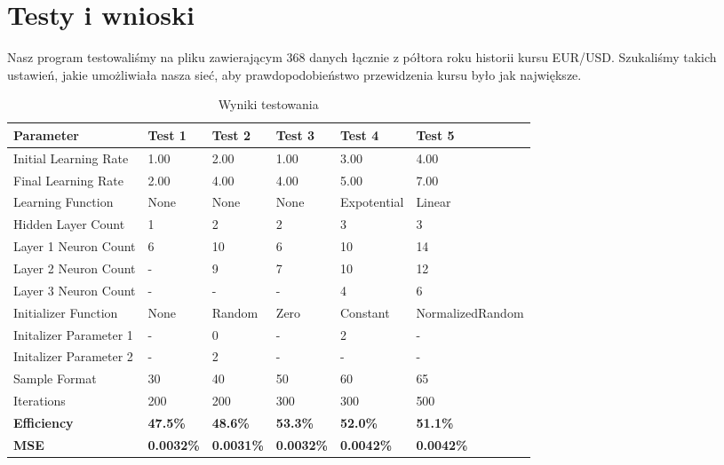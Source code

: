 \documentclass[a4paper]{article}
\begin{document}
		\part{Testy i wnioski}\indent\indent
		Nasz program testowaliśmy na pliku zawierającym 368 danych łącznie z półtora roku historii kursu EUR/USD. Szukaliśmy takich ustawień, jakie umożliwiała nasza sieć, aby prawdopodobieństwo przewidzenia kursu było jak największe.
		\newpage
			\begin{table}[ht!]
				\centering
				\caption{Wyniki testowania}
				\label{my-label}
				\begin{tabular}{l|l|l|l|l|l}
					{\bf Parameter}        & {\bf Test 1} & {\bf Test 2} & {\bf Test 3} & {\bf Test 4} & {\bf Test 5} \\ \hline
					Initial Learning Rate  &  1.00        &   2.00       &  1.00        &  3.00        & 4.00         \\
					Final Learning Rate    &  2.00        &   4.00       &  4.00        &  5.00        & 7.00         \\
					Learning Function      &  None        &   None       &  None        &  Expotential & Linear       \\
					Hidden Layer Count     &  1           &   2          &  2           &  3           & 3            \\
					Layer 1 Neuron Count   &  6           &   10         &  6           &  10          & 14           \\
					Layer 2 Neuron Count   &  -           &   9          &  7           &  10          & 12           \\
					Layer 3 Neuron Count   &  -           &   -          &  -           &  4           & 6            \\
					Initializer Function   &  None        &   Random     &  Zero        &  Constant    & NormalizedRandom\\
					Initalizer Parameter 1 &  -           &   0          &  -           &  2           & -            \\
					Initalizer Parameter 2 &  -           &   2          &  -           &  -           & -           \\
					Sample Format          &  30          &   40         & 50           &  60          & 65           \\
					Iterations             &  200         &   200        & 300          &  300         & 500          \\ \hline
					{\bf Efficiency}       &  \textbf{47.5\%}      &  \textbf{48.6\%}   & \textbf{53.3\%}    & \textbf{52.0\%}  &  \textbf{51.1\%}            \\
					{\bf MSE}              &  \textbf{0.0032\%}    &  \textbf{0.0031\%} & \textbf{0.0032\%}  & \textbf{0.0042\%}  & \textbf{0.0042\%}            
				\end{tabular}
			\end{table}
\end{document}
